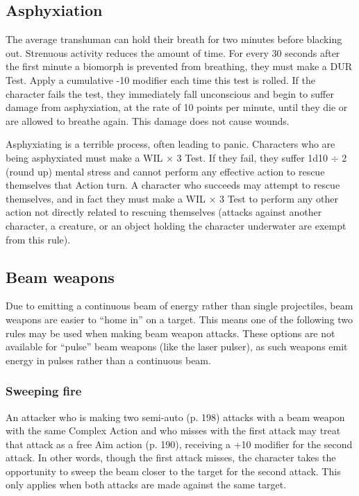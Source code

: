 \subsection{Asphyxiation} \label{sec:asphyxiation} 

The average transhuman can hold their breath for two minutes before blacking out. Strenuous activity reduces the amount of time. For every 30 seconds after the first minute a biomorph is prevented from breathing, they must make a DUR Test. Apply a cumulative -10 modifier each time this test is rolled. If the character fails the test, they immediately fall unconscious and begin to suffer damage from asphyxiation, at the rate of 10 points per minute, until they die or are allowed to breathe again. This damage does not cause wounds. 

Asphyxiating is a terrible process, often leading to panic. Characters who are being asphyxiated must make a WIL $\times$ 3 Test. If they fail, they suffer 1d10 $\div$ 2 (round up) mental stress and cannot perform any effective action to rescue themselves that Action turn. A character who succeeds may attempt to rescue themselves, and in fact they must make a WIL $\times$ 3 Test to perform any other action not directly related to rescuing themselves (attacks against another character, a creature, or an object holding the character underwater are exempt from this rule). 



\subsection{Beam weapons} \label{sec:combat-beam-weapons} 

Due to emitting a continuous beam of energy rather than single projectiles, beam weapons are easier to ``home in'' on a target. This means one of the following two rules may be used when making beam weapon attacks. These options are not available for ``pulse'' beam weapons (like the laser pulser), as such weapons emit energy in pulses rather than a continuous beam. 

\subsubsection{Sweeping fire} 

An attacker who is making two semi-auto (p. 198) attacks with a beam weapon with the same Complex Action and who misses with the first attack may treat that attack as a free Aim action (p. 190), receiving a +10 modifier for the second attack. In other words, though the first attack misses, the character takes the opportunity to sweep the beam closer to the target for the second attack. This only applies when both attacks are made against the same target. 

